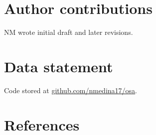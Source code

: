 \documentclass[
  12pt,
]{article}
\begin{document}
\hypertarget{author-contributions}{%
\section*{Author contributions}\label{author-contributions}}

NM wrote initial draft and later revisions.

\hypertarget{data-statement}{%
\section*{Data statement}\label{data-statement}}

Code stored at \href{github.com/nmedin17/osa}{github.com/nmedina17/osa}.

\newpage

\hypertarget{references}{%
\section*{References}\label{references}}
\end{document}
